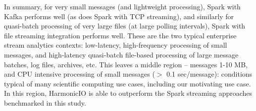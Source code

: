 \documentclass[letterpaper,conference]{IEEEtran}
\begin{document}
In summary, for very small messages (and lightweight processing), Spark with Kafka performs well (as does Spark with TCP streaming), and similarly for quasi-batch processing of very large files (at large polling intervals), Spark with file streaming integration performs well. These are the two typical enterprise stream analytics contexts: low-latency, high-frequency processing of small messages, and high-latency quasi-batch file-based processing of large message batches, log files, archives, etc.
This leaves a middle region -- messages 1-10 MB, and CPU intensive processing of small messages ($>$ 0.1 sec/message): conditions typical of many scientific computing use cases, including our motivating use case. In this region, HarmonicIO is able to outperform the Spark streaming approaches benchmarked in this study. 


\end{document}
